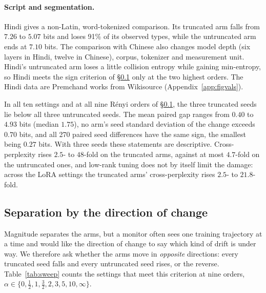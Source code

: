 \documentclass[10pt]{article}
\theoremstyle{plain}
\theoremstyle{definition}
\begin{document}
\paragraph{Script and segmentation.} Hindi gives a non-Latin, word-tokenized comparison. Its
truncated arm falls from $7.26$ to $5.07$ bits and loses 91\% of its observed types, while the
untruncated arm ends at $7.10$ bits. The comparison with Chinese also changes model depth
(six layers in Hindi, twelve in Chinese), corpus, tokenizer and measurement unit. Hindi's untruncated arm loses a little collision entropy while gaining min-entropy, so Hindi meets the sign criterion of
\S\ref{sec:sweep} only at the two highest orders. The Hindi data
are Premchand works from Wikisource (Appendix~\ref{app:figvals}).

In all ten settings and at all nine R\'enyi orders of \S\ref{sec:sweep}, the three truncated
seeds lie below all three untruncated seeds. The mean paired gap ranges from $0.40$ to $4.93$
bits (median $1.75$), no arm's seed standard deviation of the change exceeds $0.70$
bits, and all 270 paired
seed differences have the same sign, the smallest being $0.27$ bits. With three seeds these
statements are descriptive. Cross-perplexity rises $2.5$- to $48$-fold on the truncated arms,
against at most $4.7$-fold on the untruncated ones, and low-rank tuning does not by itself limit
the damage: across the LoRA settings the truncated arms' cross-perplexity rises $2.5$- to
$21.8$-fold.

\subsection{Separation by the direction of change}
\label{sec:sweep}

Magnitude separates the arms, but a monitor often sees one training trajectory at a time and
would like the direction of change to say which kind of drift is under way. We therefore ask
whether the arms move in \emph{opposite} directions: every truncated seed falls and every
untruncated seed rises, or the reverse. Table~\ref{tab:sweep} counts the settings that meet this
criterion at nine orders, $\alpha\in\{0,\tfrac12,1,\tfrac32,2,3,5,10,\infty\}$.
\end{document}
